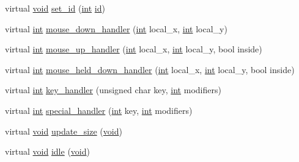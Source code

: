 \begin{DoxyCompactItemize}
\item 
virtual \hyperlink{wglext_8h_a9e6b7f1933461ef318bb000d6bd13b83}{void} \hyperlink{class_g_l_u_i___control_ad27f17ac45b13fb12d623f269d76db14}{set\+\_\+id} (\hyperlink{wglext_8h_a500a82aecba06f4550f6849b8099ca21}{int} \hyperlink{glext_8h_a58c2a664503e14ffb8f21012aabff3e9}{id})
\item 
virtual \hyperlink{wglext_8h_a500a82aecba06f4550f6849b8099ca21}{int} \hyperlink{class_g_l_u_i___control_a92b77565168a1d2003bca1c16ac00e8d}{mouse\+\_\+down\+\_\+handler} (\hyperlink{wglext_8h_a500a82aecba06f4550f6849b8099ca21}{int} local\+\_\+x, \hyperlink{wglext_8h_a500a82aecba06f4550f6849b8099ca21}{int} local\+\_\+y)
\item 
virtual \hyperlink{wglext_8h_a500a82aecba06f4550f6849b8099ca21}{int} \hyperlink{class_g_l_u_i___control_ac32aad8f69134d03682e34d0488a18f1}{mouse\+\_\+up\+\_\+handler} (\hyperlink{wglext_8h_a500a82aecba06f4550f6849b8099ca21}{int} local\+\_\+x, \hyperlink{wglext_8h_a500a82aecba06f4550f6849b8099ca21}{int} local\+\_\+y, bool inside)
\item 
virtual \hyperlink{wglext_8h_a500a82aecba06f4550f6849b8099ca21}{int} \hyperlink{class_g_l_u_i___control_a4b44e44c1c455adc7f98c63aeb6aa919}{mouse\+\_\+held\+\_\+down\+\_\+handler} (\hyperlink{wglext_8h_a500a82aecba06f4550f6849b8099ca21}{int} local\+\_\+x, \hyperlink{wglext_8h_a500a82aecba06f4550f6849b8099ca21}{int} local\+\_\+y, bool inside)
\item 
virtual \hyperlink{wglext_8h_a500a82aecba06f4550f6849b8099ca21}{int} \hyperlink{class_g_l_u_i___control_a7f9da8ca7df99bd4cf394a9fd8ce19f1}{key\+\_\+handler} (unsigned char key, \hyperlink{wglext_8h_a500a82aecba06f4550f6849b8099ca21}{int} modifiers)
\item 
virtual \hyperlink{wglext_8h_a500a82aecba06f4550f6849b8099ca21}{int} \hyperlink{class_g_l_u_i___control_ab08da363df3f3eae867dd5ae61200f23}{special\+\_\+handler} (\hyperlink{wglext_8h_a500a82aecba06f4550f6849b8099ca21}{int} key, \hyperlink{wglext_8h_a500a82aecba06f4550f6849b8099ca21}{int} modifiers)
\item 
virtual \hyperlink{wglext_8h_a9e6b7f1933461ef318bb000d6bd13b83}{void} \hyperlink{class_g_l_u_i___control_a4bfe55acbbf735a7d2ff07d687a481e2}{update\+\_\+size} (\hyperlink{wglext_8h_a9e6b7f1933461ef318bb000d6bd13b83}{void})
\item 
virtual \hyperlink{wglext_8h_a9e6b7f1933461ef318bb000d6bd13b83}{void} \hyperlink{class_g_l_u_i___control_a4eb47a3c2c20c0c24dca192a2eb96c8d}{idle} (\hyperlink{wglext_8h_a9e6b7f1933461ef318bb000d6bd13b83}{void})

\end{DoxyCompactItemize}
